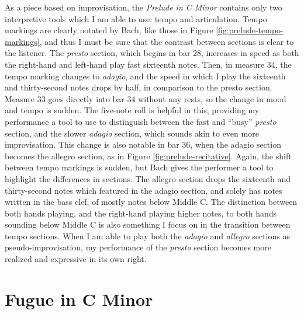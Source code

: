 As a piece based on improvisation, the \textit{Prelude in C Minor} contains only two interpretive tools which I am able to use: tempo and articulation. Tempo markings are clearly notated by Bach, like those in Figure \ref{fig:prelude-tempo-markings}\autocite{Henle_2009}, and thus I must be sure that the contrast between sections is clear to the listener. The \textit{presto} section, which begins in bar 28, increases in speed as both the right-hand and left-hand play fast sixteenth notes. Then, in measure 34, the tempo marking changes to \textit{adagio}, and the speed in which I play the sixteenth and thirty-second notes drops by half, in comparison to the presto section. Measure 33 goes directly into bar 34 without any rests, so the change in mood and tempo is sudden. The five-note roll is helpful in this, providing my performance a tool to use to distinguish between the fast and ``busy'' \textit{presto} section, and the slower \textit{adagio} section, which sounds akin to even more improvisation. This change is also notable in bar 36, when the adagio section becomes the allegro section, as in Figure \ref{fig:prelude-recitative}. Again, the shift between tempo markings is sudden, but Bach gives the performer a tool to highlight the differences in sections. The allegro section drops the sixteenth and thirty-second notes which featured in the adagio section, and solely has notes written in the bass clef, of mostly notes below Middle C. The distinction between both hands playing, and the right-hand playing higher notes, to both hands sounding below Middle C is also something I focus on in the transition between tempo sections. When I am able to play both the \textit{adagio} and \textit{allegro} sections as pseudo-improvisation, my performance of the \textit{presto} section becomes more realized and expressive in its own right. 

\section{Fugue in C Minor}

